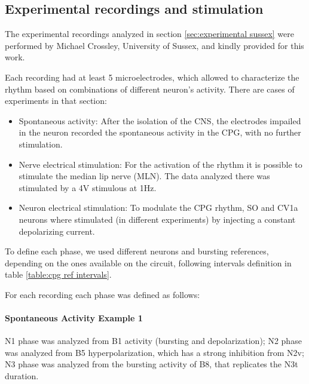 


\subsection{Experimental recordings and stimulation}
\label{subsec:methods experimental intervals}
The experimental recordings analyzed in section \ref{sec:experimental sussex} were performed by Michael Crossley, University of Sussex, and kindly provided for this work. 

Each recording had at least 5 microelectrodes, which allowed to characterize the rhythm based on combinations of different neuron's activity. There are cases of experiments in that section:
\begin{itemize}
	\item Spontaneous activity: After the isolation of the CNS, the electrodes impailed in the neuron recorded the spontaneous activity in the CPG, with no further stimulation.
	\item Nerve electrical stimulation: For the activation of the rhythm it is possible to stimulate the median lip nerve (MLN). The data analyzed there was stimulated by a 4V stimulous at 1Hz. 
	\item Neuron electrical stimulation: To modulate the CPG rhythm, SO and CV1a neurons where stimulated (in different experiments) by injecting a constant depolarizing current.
\end{itemize}

To define each phase, we used different neurons and bursting references, depending on the ones available on the circuit, following intervals definition in table \ref{table:cpg ref intervals}.

For each recording each phase was defined as follows:

\paragraph{Spontaneous Activity Example 1}
N1 phase was analyzed from B1 activity (bursting and depolarization); N2 phase was analyzed from B5 hyperpolarization, which has a strong inhibition from N2v; N3 phase was analyzed from the bursting activity of B8, that replicates the N3t duration. 


